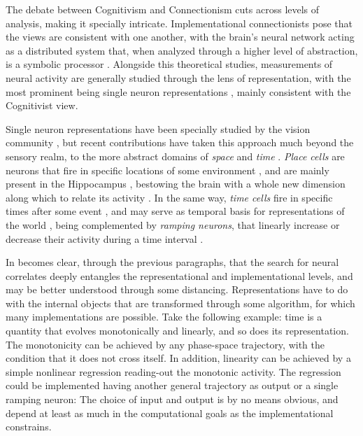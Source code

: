    The debate between Cognitivism and Connectionism cuts across levels of analysis, making it specially intricate. Implementational connectionists pose that the views are consistent with one another, with the brain's neural network acting as a distributed system that, when analyzed through a higher level of abstraction, is a symbolic processor \cite{}. Alongside this theoretical studies, measurements of neural activity are generally studied through the lens of representation, with the most prominent being single neuron representations \cite{}, mainly consistent with the Cognitivist view.
    
    Single neuron representations have been specially studied by the vision community \cite{deyoe1988concurrent,bell1997independent,ito2004representation,lee2008sparse}, but recent contributions have taken this approach much beyond the sensory realm, to the more abstract domains of \textit{space} and \textit{time} \cite{eichenbaum2014time}. \textit{Place cells} are neurons that fire in specific locations of some environment \cite{foster2006reverse}, and are mainly present in the Hippocampus \cite{o1979review}, bestowing the brain with a whole new dimension along which to relate its activity \cite{eichenbaum2014time}. In the same way, \textit{time cells} fire in specific times after some event \cite{tiganj2016sequential, eichenbaum2014time}, and may serve as temporal basis for representations of the world \cite{ludvig2008stimulus}, being complemented by \textit{ramping neurons}, that linearly increase or decrease their activity during a time interval \cite{morrison2009convergence, kim2013neural, tiganj2016sequential, parker2016timing}.
    
    In becomes clear, through the previous paragraphs, that the search for neural correlates deeply entangles the representational and implementational levels, and may be better understood through some distancing. Representations have to do with the internal objects that are transformed through some algorithm, for which many implementations are possible. Take the following example: time is a quantity that evolves monotonically and linearly, and so does its representation. The monotonicity can be achieved by any phase-space trajectory, with the condition that it does not cross itself. In addition, linearity can be achieved by a simple nonlinear regression reading-out the monotonic activity. The regression could be implemented having another general trajectory as output \cite{} or a single ramping neuron: The choice of input and output is by no means obvious, and depend at least as much in the computational goals as the implementational constrains.
    
